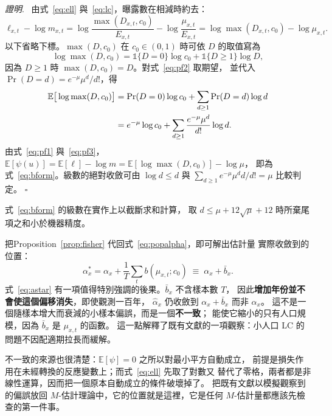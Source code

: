 \documentclass[UTF8, fontset=macnew, a4paper, 12pt]{ctexart}
\newenvironment{proof}{\par\noindent\textit{證明}.\ }{\hfill$\square$\par\vspace{4pt}}
\newcommand{\Ex}{\mathbb{E}}
\begin{document}
\begin{proof}
由式~\eqref{eq:ell} 與~\eqref{eq:lc}，曝露數在相減時約去：
\begin{equation}\label{eq:pf1}
\ell_{x,t}-\log m_{x,t}
=\log\frac{\max(D_{x,t},c_0)}{E_{x,t}}-\log\frac{\mu_{x,t}}{E_{x,t}}
=\log\max(D_{x,t},c_0)-\log\mu_{x,t}.
\end{equation}
以下省略下標。$\max(D,c_0)$ 在 $c_0\in(0,1)$ 時可依 $D$ 的取值寫為
\begin{equation}\label{eq:pf2}
\log\max(D,c_0)=\mathbb{1}\{D=0\}\log c_0+\mathbb{1}\{D\ge1\}\log D ,
\end{equation}
因為 $D\ge1$ 時 $\max(D,c_0)=D$。對式~\eqref{eq:pf2} 取期望，
並代入 $\Pr(D=d)=e^{-\mu}\mu^{d}/d!$，得
\begin{align}
\Ex\big[\log\max(D,c_0)\big]
&=\Pr(D=0)\log c_0+\sum_{d\ge1}\Pr(D=d)\log d \notag\\
&=e^{-\mu}\log c_0+\sum_{d\ge1}\frac{e^{-\mu}\mu^{d}}{d!}\log d .
\label{eq:pf3}
\end{align}
由式~\eqref{eq:pf1} 與~\eqref{eq:pf3}，
$\Ex[\psi(u)]=\Ex[\ell]-\log m=\Ex[\log\max(D,c_0)]-\log\mu$，
即為式~\eqref{eq:bform}。級數的絕對收斂可由 $\log d\le d$ 與
$\sum_{d\ge1}e^{-\mu}\mu^{d}d/d!=\mu$ 比較判定。
\end{proof}

式~\eqref{eq:bform} 的級數在實作上以截斷求和計算，
取 $d\le\mu+12\sqrt{\mu}+12$ 時所棄尾項之和小於機器精度。

把Proposition~\ref{prop:fisher} 代回式~\eqref{eq:popalpha}，即可解出估計量
實際收斂到的位置：
\begin{equation}\label{eq:astar}
\alpha_x^{\ast}
=\alpha_x+\frac1T\sum_t b(\mu_{x,t};c_0)
\;\equiv\;\alpha_x+\bar b_x .
\end{equation}
式~\eqref{eq:astar} 有一項值得特別強調的後果。$\bar b_x$ 不含樣本數 $T$，
因此\textbf{增加年份並不會使這個偏移消失}，即使觀測一百年，
$\hat\alpha_x$ 仍收斂到 $\alpha_x+\bar b_x$ 而非 $\alpha_x$。
這不是一個隨樣本增大而衰減的小樣本偏誤，而是一個\textbf{不一致}；
能使它縮小的只有人口規模，因為 $\bar b_x$ 是 $\mu_{x,t}$ 的函數。
這一點解釋了既有文獻的一項觀察：小人口 LC 的問題不因配適期拉長而緩解。

不一致的來源也很清楚：$\Ex[\psi]=0$ 之所以對最小平方自動成立，
前提是損失作用在未經轉換的反應變數上；而式~\eqref{eq:ell} 先取了對數又
替代了零格，兩者都是非線性運算，因而把一個原本自動成立的條件破壞掉了。
把既有文獻以模擬觀察到的偏誤放回 $M$-估計理論中，它的位置就是這裡，它是任何 $M$-估計量都應該先檢查的第一件事。
\end{document}
